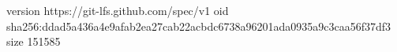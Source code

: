 version https://git-lfs.github.com/spec/v1
oid sha256:ddad5a436a4e9afab2ea27cab22acbdc6738a96201ada0935a9c3caa56f37df3
size 151585

